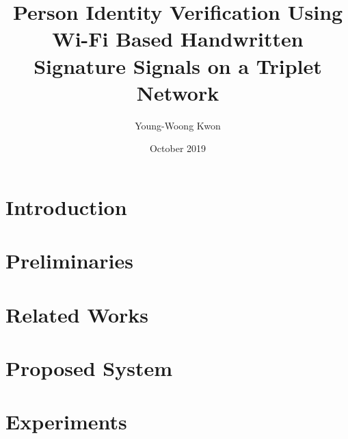 \documentclass[a4paper,11pt]{report}
\title{Person Identity Verification Using Wi-Fi Based Handwritten Signature Signals on a Triplet Network}
\author{Young-Woong Kwon}
\date{October 2019}
\begin{document}
\makecover
\maketitle

\signaturepage

\pagestyle{plain}
\baselineskip 8.5mm
 \pagestyle{plain}
%
\setcounter{page}{0}
\tableofcontents
\listoffigures
{}
\listoftables
{}

\begin{abstract}

\end{abstract}

\chapter{Introduction}\label{chapter:Introduction}

%

\chapter{Preliminaries}\label{chapter:Preliminaries}


\chapter{Related Works}\label{chapter:Related Works}


%

\chapter{Proposed System}\label{chapter:Proposed Method}


\chapter{Experiments}\label{chapter:Experiments}

\end{document}
